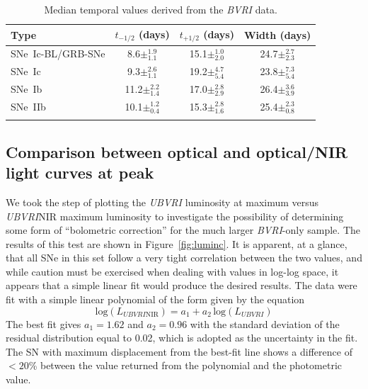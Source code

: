 \documentclass[a4paper,fleqn,usenatbib]{mnras}
\begin{document}
\begin{table}
\renewcommand{\arraystretch}{1.5}
 \centering
 \begin{minipage}{85mm}
  \caption{Median temporal values derived from the \textit{BVRI} data.}
 \begin{tabular}{lccc}
  \hline
 Type &  $t_{-1/2}$ (days) & $t_{+1/2}$ (days) & Width (days) \\
  \hline
SNe~Ic-BL/GRB-SNe & 8.6$\pm^{1.9}_{1.1}$ & 15.1$\pm^{1.0}_{2.0}$ & 24.7$\pm^{2.7}_{2.3}$\\
SNe~Ic & 9.3$\pm^{2.6}_{1.1}$ & 19.2$\pm^{4.7}_{5.4}$ & 23.8$\pm^{7.3}_{5.4}$\\
SNe~Ib & 11.2$\pm^{2.2}_{1.4}$ & 17.0$\pm^{2.8}_{2.9}$ & 26.4$\pm^{3.6}_{3.9}$\\
SNe~IIb & 10.1$\pm^{1.2}_{0.4}$ & 15.3$\pm^{2.8}_{1.6}$ & 25.4$\pm^{2.3}_{0.8}$\\
\hline
 \label{BVRIgroup}
\end{tabular}
\end{minipage}
\end{table}

\subsection{Comparison between optical and optical/NIR light curves at peak}
We took the step of plotting the \textit{UBVRI} luminosity at maximum versus \textit{UBVRI}NIR maximum luminosity to investigate the possibility of determining some form of ``bolometric correction'' for the much larger \textit{BVRI}-only sample. The results of this test are shown in Figure~\ref{fig:luminc}. It is apparent, at a glance, that all SNe in this set follow a very tight correlation between the two values, and while caution must be exercised when dealing with values in log-log space, it appears that a simple linear fit would produce the desired results. The data were fit with a simple linear polynomial of the form given by the equation 
\begin{equation}
\mathrm{log}(L_{UBVRI\mathrm{NIR}})=a_{1}+a_{2}\,\mathrm{log}(L_{UBVRI})
\label{lumincfit}
\end{equation}
The best fit gives $a_{1}=1.62$ and $a_{2}=0.96$ with the standard deviation of the residual distribution equal to 0.02, which is adopted as the uncertainty in the fit. The SN with maximum displacement from the best-fit line shows a difference of $< 20$\% between the value returned from the polynomial and the photometric value.
\end{document}
